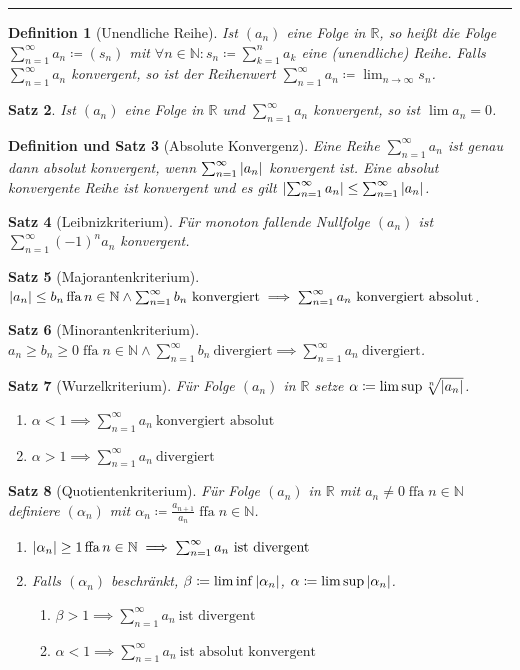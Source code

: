 \documentclass[a4paper]{article}
\newcounter{Sec}
\theoremstyle{marginbreak}
\newtheorem{definition}{Definition}[Sec]
\newtheorem{satz}[definition]{Satz}
\newtheorem{defsatz}[definition]{Definition und Satz}
\DeclareMathOperator{\ffa}{ffa}
\newcommand{\sep}{%
	\rule{\textwidth}{0.3pt}%
	\stepcounter{Sec}%
	}
\newcommand{\series}[1][1]{\sum_{n=#1}^\infty}
\begin{document}
	\sep
	\begin{definition}[Unendliche Reihe]
		Ist $(a_n)$ eine Folge in $\mathbb{R}$, so heißt die Folge $\series a_n\coloneqq(s_n)$
		mit $\forall n\in\mathbb{N}:s_n\coloneqq\sum_{k=1}^na_k$ eine (unendliche)
		Reihe. Falls $\series a_n$ konvergent, so ist der Reihenwert
		$\series a_n\coloneqq\lim_{n\to\infty}s_n$.
	\end{definition}
	\begin{satz}
		Ist $(a_n)$ eine Folge in $\mathbb{R}$ und $\series a_n$ konvergent,
		so ist $\lim a_n=0$.
	\end{satz}
	\begin{defsatz}[Absolute Konvergenz]
		Eine Reihe $\series a_n$ ist genau dann absolut konvergent, wenn
		$\series\abs{a_n}$ konvergent ist. Eine absolut konvergente
		Reihe ist konvergent und es gilt
		$\abs{\series a_n}\leq\series\abs{a_n}$.
	\end{defsatz}
	\begin{satz}[Leibnizkriterium]
		Für monoton fallende Nullfolge $(a_n)$ ist $\series (-1)^na_n$
		konvergent.
	\end{satz}
	\begin{satz}[Majorantenkriterium]
		$\abs{a_n}\leq b_n\ffa n\in\mathbb{N}\wedge\series b_n~\text{konvergiert}
		\implies\series a_n~\text{konvergiert absolut}$.
	\end{satz}
	\begin{satz}[Minorantenkriterium]
		$a_n\geq b_n\geq0\ffa n\in\mathbb{N}\wedge\series b_n~\text{divergiert}
		\implies\series a_n~\text{divergiert}$.
	\end{satz}
	\begin{satz}[Wurzelkriterium]
		Für Folge $(a_n)$ in $\mathbb{R}$ setze $\alpha\coloneqq\lim\sup\sqrt[n]{\abs{a_n}}$.
		\begin{enumerate}[label=(\alph*)]
			\item $\alpha<1\implies\series a_n~\text{konvergiert absolut}$
			\item $\alpha>1\implies\series a_n~\text{divergiert}$
		\end{enumerate}
	\end{satz}
	\begin{satz}[Quotientenkriterium]
		Für Folge $(a_n)$ in $\mathbb{R}$ mit $a_n\neq0\ffa n\in\mathbb{N}$ definiere
		$(\alpha_n)$ mit $\alpha_n\coloneqq\frac{a_{n+1}}{a_n}\ffa n\in\mathbb{N}$.
		\begin{enumerate}[label=(\alph*)]
			\item $\abs{\alpha_n}\geq1\ffa n\in\mathbb{N}\implies\series a_n~\text{ist divergent}$
			\item Falls $(\alpha_n)$ beschränkt, $\beta\coloneqq\lim\inf\abs{\alpha_n}$,
			$\alpha\coloneqq\lim\sup\abs{\alpha_n}$.
			\begin{enumerate}[label=(\roman*)]
				\item $\beta>1\implies\series a_n~\text{ist divergent}$
				\item $\alpha<1\implies\series a_n~\text{ist absolut konvergent}$
			\end{enumerate}
		\end{enumerate}
	\end{satz}
\end{document}
